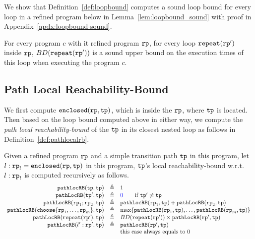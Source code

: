 We show that Definition~\ref{def:loopbound} computes a sound loop bound for every loop in a refined program below in Lemma~\ref{lem:loopbound_sound} with proof in Appendix~\ref{apdx:loopbound-sound}.
\begin{lem}
  \label{lem:loopbound_sound}
  For every program $c$ with it refined program $\mathtt{rp}$,
  for every loop $\mathtt{repeat}(\mathtt{rp}')$ inside $\mathtt{rp}$, 
  $BD(\mathtt{repeat}(\mathtt{rp}'))$ is a sound upper bound on the execution times of this loop when executing the program $c$.
\end{lem}


\subsection{Path Local Reachability-Bound}
We first compute $\mathtt{enclosed}(\mathtt{rp}, \mathtt{tp})$, which is  inside the $\mathtt{rp}$, where $\mathtt{tp}$ is located.
\\
Then based on the loop bound computed above in either way, we compute the \emph{path local reachability-bound} of
the $\mathtt{tp}$ in its closest nested loop as follows in Definition~\ref{def:pathlocalrb}.
\begin{defn}
    \label{def:pathlocalrb}
    Given a refined program $\mathtt{rp}$ and a simple transition path $\mathtt{tp}$ in this program, 
    let $l: \mathtt{rp}_l = \mathtt{enclosed}(\mathtt{rp}, \mathtt{tp})$ in this program,
    $\mathtt{tp}$'s local reachability-bound w.r.t. $l: \mathtt{rp}_l$
    is computed recursively as follows. 
  \[
    \begin{array}{rcl}
      \outinB(\tpath, \tpath) & \triangleq & 1 \\
      \outinB(\tpath', \tpath) & \triangleq & \highlight{0} \qquad \text{if } \tpath' \neq \tpath\\
      \outinB(\rprog_1;\rprog_2, \tpath) & \triangleq & \outinB(\rprog_1, \tpath) + \outinB(\rprog_2, \tpath) \\
      \outinB(\rpchoose{\rprog_1, \ldots, \rprog_m }, \tpath) & \triangleq 
      & \max\left\{ \outinB(\rprog_1, \tpath), \ldots, \outinB(\rprog_m, \tpath) \right\} \\
      \outinB(\rprepeat(\rprog'), \tpath) & \triangleq 
      & BD(\rprepeat(\rprog'))
       \times \outinB(\rprog', \tpath)
       \\
      \outinB(l': \rprog', \tpath) & \triangleq & \outinB(\rprog', \tpath) \\
      &  & \text{this case always equals to } 0 \\
    \end{array}
    \]
\end{defn}
